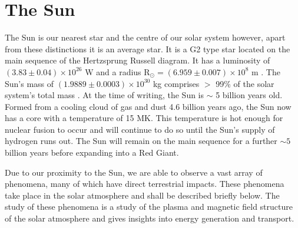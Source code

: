 \section{The Sun}
The Sun is our nearest star and the centre of our solar system however, apart from these distinctions it is an average star. It is a G2 type star located on the main sequence of the Hertzsprung Russell diagram. It has a luminosity of $(3.83 \pm 0.04) \times 10^{26}$ W and a radius R$_\odot = (6.959 \pm 0.007) \times 10^8$ m \citep{Foukal2004}. The Sun's mass of $(1.9889 \pm 0.0003) \times 10^{30}$ kg comprises $>$ 99\% of the solar system's total mass \citep{Foukal2004}. At the time of writing, the Sun is $\sim$ 5 billion years old. Formed from a cooling cloud of gas and dust 4.6 billion years ago, the Sun now has a core with a temperature of 15 MK. This temperature is hot enough for nuclear fusion to occur and will continue to do so until the Sun's supply of hydrogen runs out. The Sun will remain on the main sequence for a further $\sim 5$ billion years before expanding into a Red Giant. %

Due to our proximity to the Sun, we are able to observe a vast array of phenomena, many of which have direct terrestrial impacts. These phenomena take place in the solar atmosphere and shall be described briefly below. The study of these phenomena is a study of the plasma and magnetic field structure of the solar atmosphere and gives insights into energy generation and transport.
